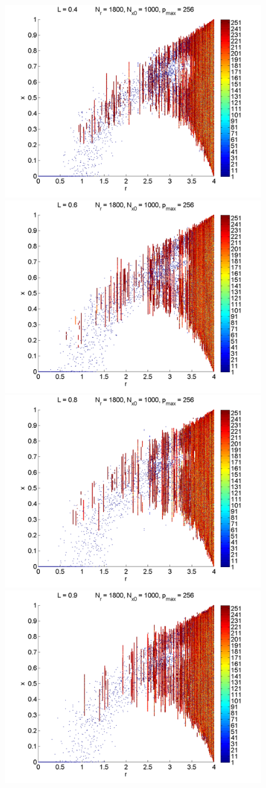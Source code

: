 \begin{figure}[H]
\begin{center}
		\includegraphics[width=.5\textwidth]{figs/rlog_bif_L_04.png}\hfill
		\includegraphics[width=.5\textwidth]{figs/rlog_bif_L_06.png}\\
		\includegraphics[width=.5\textwidth]{figs/rlog_bif_L_08.png}\hfill
		\includegraphics[width=.5\textwidth]{figs/rlog_bif_L_09.png}\\
	\end{center}
\end{figure}

